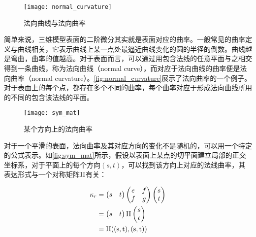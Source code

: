 \begin{figure}[tbh]
    \centering
    \texttt{[image: normal\_curvature]}
    \caption[法向曲线与法向曲率]{\label{fig:normal_curvature}
    法向曲线与法向曲率\cite{rusinkiewicz2008line}}
\end{figure}

简单来说，三维模型表面的二阶微分其实就是表面对应的曲率。一般常见的曲率定义与曲线相关，它表示曲线上某一点处最逼近曲线变化的圆的半径的倒数。曲线越是弯曲，曲率的值越高。对于表面而言，可以通过用包含法线的任意平面与之相交得到一条曲线，称为法向曲线（normal curve），而对应于法向曲线的曲率便是法向曲率（normal curvature）。\autoref{fig:normal_curvature}展示了法向曲率的一个例子。对于表面上的每个点，都存在多个不同的曲率，每个曲率对应于形成法向曲线所用的不同的包含该法线的平面。

\begin{figure}[tbh]
    \centering
    \texttt{[image: sym\_mat]}
    \caption[某个方向上的法向曲率]{\label{fig:sym_mat}
    某个方向上的法向曲率\cite{rusinkiewicz2008line}}
\end{figure}

对于一个平滑的表面，法向曲率及其对应方向的变化不是随机的，可以用一个特定的公式表示。如\autoref{fig:sym_mat}所示，假设以表面上某点的切平面建立局部的正交坐标系，对于平面上的每个方向$(s,t)$，可以找到该方向上对应的法线曲率，其表达形式与一个对称矩阵$\rm II$有关：

\begin{equation}
    \begin{split}
        \kappa_r &= 
        \begin{pmatrix}
            s & t
        \end{pmatrix}
        \begin{pmatrix}
            e & f \\
            f & g
        \end{pmatrix}
        \begin{pmatrix}
            s \\
            t
        \end{pmatrix} \\
        &= 
        \begin{pmatrix}
            s & t
        \end{pmatrix}
        \rm II
        \begin{pmatrix}
            s \\
            t
        \end{pmatrix} \\
        &= 
        \rm II((s, t), (s, t))
    \end{split}
\end{equation}

